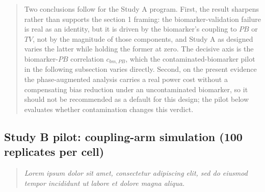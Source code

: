 \documentclass[
  11pt,
]{article}
\newenvironment{rgt}{%
  \begin{quote}\small\itshape\color[RGB]{20,60,160}}{%
  \end{quote}}
\newenvironment{orig}{%
  \begin{quote}\normalsize\color[gray]{0.55}}{%
  \end{quote}}
\begin{document}
\begin{orig}
Two conclusions follow for the Study A program. First, the
result sharpens rather than supports the section 1 framing: the
biomarker-validation failure is real as an identity, but it is
driven by the biomarker's coupling to \(PB\) or \(TV\), not by the
magnitude of those components, and Study A as designed
varies the latter while holding the former at zero. The decisive
axis is the biomarker-\(PB\) correlation \(c_{bm,PB}\), which the
contaminated-biomarker pilot in the following subsection varies
directly. Second, on the present evidence the phase-augmented
analysis carries a real power cost without a compensating bias
reduction under an uncontaminated biomarker, so it should not be
recommended as a default for this design; the pilot below
evaluates whether contamination changes this verdict.

\end{orig}

\subsection{Study B pilot: coupling-arm simulation (100 replicates per cell)}\label{study-b-pilot-coupling-arm-simulation-100-replicates-per-cell}

\begin{rgt}
Lorem ipsum dolor sit amet, consectetur adipiscing elit, sed do eiusmod tempor incididunt ut labore et dolore magna aliqua.

\end{rgt}
\end{document}
